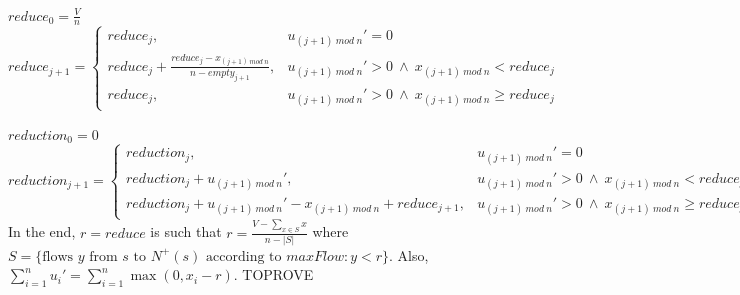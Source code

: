 \documentclass[11pt]{article}
\theoremstyle{definition}
\theoremstyle{corollary}
\begin{document}
       $reduce_0 = \frac{V}{n}$ \\
       $reduce_{j+1} =
          \begin{cases}
             reduce_j, & u_{(j+1)\:mod\:n}' = 0 \\
             reduce_j + \frac{reduce_j-x_{(j+1)\:mod\:n}}{n-empty_{j+1}}, & u_{(j+1)\:mod\:n}' > 0 \: \wedge \:
                x_{(j+1) \:mod\:n} < reduce_j \\
             reduce_j, & u_{(j+1)\:mod\:n}' > 0 \: \wedge \: x_{(j+1) \:mod\:n} \geq reduce_j
          \end{cases}$ \\ \ \\
       $reduction_0 = 0$ \\
       $reduction_{j+1} =
          \begin{cases}
             reduction_j, & u_{(j+1)\:mod\:n}' = 0 \\
             reduction_j + u_{(j+1)\:mod\:n}', & u_{(j+1)\:mod\:n}' > 0 \: \wedge \: x_{(j+1) \:mod\:n} < reduce_j \\
             reduction_j + u_{(j+1)\:mod\:n}' - x_{(j+1)\:mod\:n} + reduce_{j+1}, &
                u_{(j+1)\:mod\:n}' > 0 \: \wedge \: x_{(j+1) \:mod\:n} \geq reduce_j
          \end{cases}$ \\
       In the end, $r = reduce$ is such that $r = \frac{V - \sum\limits_{x \in S}x}{n - |S|}$ where
       $S = \{\text{flows } y \text{ from } s \text{ to } N^{+}(s) \text{ according to } maxFlow : y < r\}$. Also,
       $\sum\limits_{i=1}^{n}u_i' = \sum\limits_{i=1}^{n}\max{(0,x_i - r)}$. TOPROVE
\end{document}
